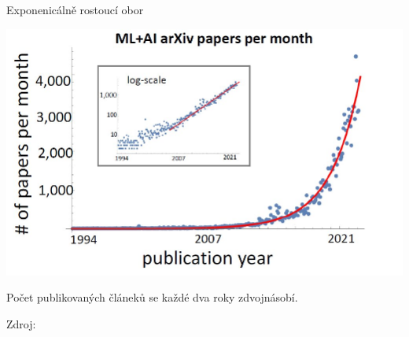 \documentclass[aspectratio=169,dvipsnames]{beamer}
\begin{document}
\begin{frame}{Exponenicálně rostoucí obor}

    \centering
    \includegraphics[scale=.25]{./img/exp_growth.jpg}

    Počet publikovaných článeků se každé dva roky zdvojnásobí.

    {\footnotesize Zdroj: \citet{krenn2022prediction}}

\end{frame}

\end{document}

